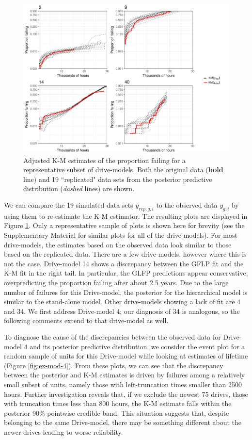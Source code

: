 \documentclass[aoas]{imsart}
\begin{document}
\begin{figure}[H]
\includegraphics[width=\textwidth]{ppcheck-sample}
\caption{Adjusted K-M estimates of the proportion failing for a representative subset of drive-models. Both the original data (\textbf{bold} line) and 19 ``replicated" data sets from the posterior predictive distribution (\textit{dashed} lines) are shown.}
\label{fig:post-pred-KM}
\end{figure}

We can compare the 19 simulated data sets $y_{rep,g, i}$ to the observed data $y_{g,i}$ by using them to re-estimate the K-M estimator. The resulting plots are displayed in Figure \ref{fig:post-pred-KM}. Only a representative sample of plots is shown here for brevity (see the Supplementary Material for similar plots for all of the drive-models).  For most drive-models, the estimates based on the observed data look similar to those based on the replicated data.  There are a few drive-models, however where this is not the case. Drive-model 14 shows a discrepancy between the GFLP fit and the K-M fit in the right tail. In particular, the GLFP predictions appear conservative, overpredicting the proportion failing after about 2.5 years. Due to the large number of failures for this Drive-model, the posterior for the hierarchical model is similar to the stand-alone model. Other drive-models showing a lack of fit are 4 and 34. We first address Drive-model 4; our diagnosis of 34 is analogous, so the following comments extend to that drive-model as well.


To diagnose the cause of the discrepancies between the observed data for Drive-model 4 and its posterior predictive distribution, we consider the event plot for a random sample of units for this Drive-model while looking at estimates of lifetime (Figure \ref{fig:ex-mod-4}). From these plots, we can see that the discrepancy between the posterior and K-M estimates is driven by failures among a relatively small subset of units, namely those with left-truncation times smaller than 2500 hours. Further investigation reveals that, if we exclude the newest 75 drives, those with truncation times less than 800 hours, the K-M estimate falls within the posterior 90\% pointwise credible band. This situation suggests that, despite belonging to the same Drive-model, there may be something different about the newer drives leading to worse reliability. 
\end{document}
